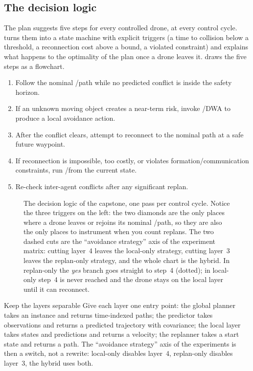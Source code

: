 \subsection{The decision logic}
\label{sec:appA-logic}
The plan suggests five steps for every controlled drone, at every control cycle.
 turns them into a state machine with explicit triggers (a time to collision
below a threshold, a reconnection cost above a bound, a violated constraint) and explains
what happens to the optimality of the \cbs plan once a drone leaves it.
 draws the five steps as a flowchart.
\begin{enumerate}
  \item Follow the nominal \cbs/\ecbs path while no predicted conflict is inside the safety
    horizon.
  \item If an unknown moving object creates a near-term risk, invoke \orca/DWA to produce a
    local avoidance action.
  \item After the conflict clears, attempt to reconnect to the nominal path at a safe future
    waypoint.
  \item If reconnection is impossible, too costly, or violates formation/communication
    constraints, run \dstarlite/\astar from the current state.
  \item Re-check inter-agent conflicts after any significant replan.
\end{enumerate}

\begin{figure}[tbh]
\centering
{}
\caption{The decision logic of the capstone, one pass per control cycle. Notice the three
triggers on the left: the two diamonds are the only places where a drone leaves or rejoins
its nominal \cbs/\ecbs path, so they are also the only places to instrument when you count
replans. The two dashed cuts are the ``avoidance strategy'' axis of the experiment matrix:
cutting layer~4 leaves the local-only strategy, cutting layer~3 leaves the replan-only
strategy, and the whole chart is the hybrid. In replan-only the \emph{yes} branch goes
straight to step~4 (dotted); in local-only step~4 is never reached and the drone stays on
the local layer until it can reconnect.}
\label{fig:appA-decision-logic}
\end{figure}

\begin{notebox}{Keep the layers separable}
Give each layer one entry point: the global planner takes an instance and returns
time-indexed paths; the predictor takes observations and returns a predicted trajectory
with covariance; the local layer takes states and predictions and returns a velocity; the
replanner takes a start state and returns a path. The ``avoidance strategy'' axis of the
experiments is then a switch, not a rewrite: local-only disables layer~4, replan-only
disables layer~3, the hybrid uses both.
\end{notebox}

